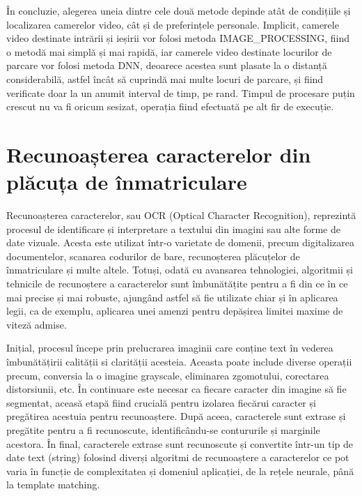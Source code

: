 \documentclass[12pt]{article}
\begin{document}
\^{I}n concluzie, alegerea uneia dintre cele dou\u{a} metode depinde at\^{a}t de condițiile și localizarea camerelor video, c\^{a}t și de preferințele personale. Implicit, camerele video destinate intr\u{a}rii și ieșirii vor folosi metoda IMAGE\_PROCESSING, fiind o metod\u{a} mai simpl\u{a} și mai rapid\u{a}, iar camerele video destinate locurilor de parcare vor folosi metoda DNN, deoarece acestea sunt plasate la o distanț\u{a} considerabil\u{a}, astfel \^{i}nc\^{a}t s\u{a} cuprind\u{a} mai multe locuri de parcare, și fiind verificate doar la un anumit interval de timp, pe rand. Timpul de procesare puțin crescut nu va fi oricum sesizat, operația fiind efectuat\u{a} pe alt fir de execuție.

\newpage
 
\section{Recunoașterea caracterelor din pl\u{a}cuța de \^{i}nmatriculare}

Recunoașterea caracterelor, sau OCR (Optical Character Recognition), reprezint\u{a} procesul de identificare și interpretare a textului din imagini sau alte forme de date vizuale. Acesta este utilizat \^{i}ntr-o varietate de domenii, precum digitalizarea documentelor, scanarea codurilor de bare, recunoșterea pl\u{a}cuțelor de \^{i}nmatriculare și multe altele. Totuși, odat\u{a} cu avansarea tehnologiei, algoritmii și tehnicile de recunoștere a caracterelor sunt \^{i}mbun\u{a}t\u{a}țite pentru a fi din ce \^{i}n ce mai precise și mai robuste, ajung\^{a}nd astfel s\u{a} fie utilizate chiar și \^{i}n aplicarea legii, ca de exemplu, aplicarea unei amenzi pentru dep\u{a}șirea limitei maxime de vitez\u{a} admise.

Inițial, procesul \^{i}ncepe prin prelucrarea imaginii care conține text \^{i}n vederea \^{i}mbun\u{a}t\u{a}țirii calit\u{a}ții si clarit\u{a}ții acesteia. Aceasta poate include diverse operații precum, conversia la o imagine grayscale, eliminarea zgomotului, corectarea distorsiunii, etc. \^{I}n continuare este necesar ca fiecare caracter din imagine s\u{a} fie segmentat, aceas\u{a} etap\u{a} fiind crucial\u{a} pentru izolarea fiec\u{a}rui caracter și preg\u{a}tirea acestuia pentru recunoaștere. Dup\u{a} aceea, caracterele sunt extrase și preg\u{a}tite pentru a fi recunoscute, identific\^{a}ndu-se contururile și marginile acestora. \^{I}n final, caracterele extrase sunt recunoscute și convertite \^{i}ntr-un tip de date text (string) folosind diverși algoritmi de recunoaștere a caracterelor ce pot varia \^{i}n funcție de complexitatea și domeniul aplicației, de la rețele neurale, p\^{a}n\u{a} la template matching.
\end{document}
